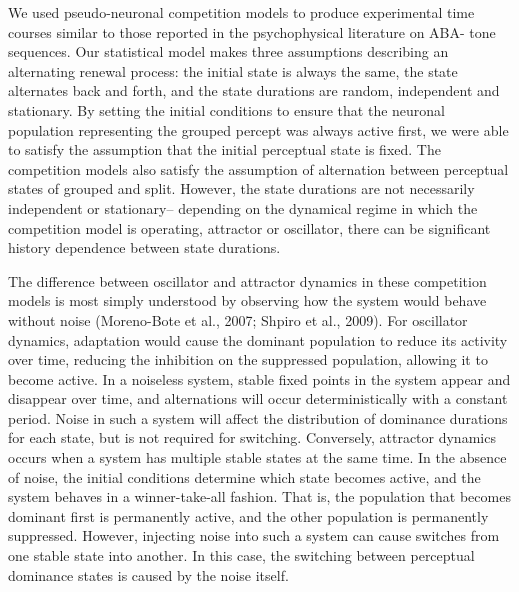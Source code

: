 We used pseudo-neuronal competition models to produce experimental time courses similar to those reported in the psychophysical literature on ABA- tone sequences. Our statistical model makes three assumptions describing an alternating renewal process: the initial state is always the same, the state alternates back and forth, and the state durations are random, independent and stationary. By setting the initial conditions to ensure that the neuronal population representing the grouped percept was always active first, we were able to satisfy the assumption that the initial perceptual state is fixed. The competition models also satisfy the assumption of alternation between perceptual states of grouped and split. However, the state durations are not necessarily independent or stationary-- depending on the dynamical regime in which the competition model is operating, attractor or oscillator, there can be significant history dependence between state durations. 

The difference between oscillator and attractor dynamics in these competition models is most simply understood by observing how the system would behave without noise (Moreno-Bote et al., 2007; Shpiro et al., 2009). For oscillator dynamics, adaptation would cause the dominant population to reduce its activity over time, reducing the inhibition on the suppressed population, allowing it to become active. In a noiseless system, stable fixed points in the system appear and disappear over time, and alternations will occur deterministically with a constant period. Noise in such a system will affect the distribution of dominance durations for each state, but is not required for switching. Conversely, attractor dynamics occurs when a system has multiple stable states at the same time. In the absence of noise, the initial conditions determine which state becomes active, and the system behaves in a winner-take-all fashion. That is, the population that becomes dominant first is permanently active, and the other population is permanently suppressed. However, injecting noise into such a system can cause switches from one stable state into another. In this case, the switching between perceptual dominance states is caused by the noise itself.

